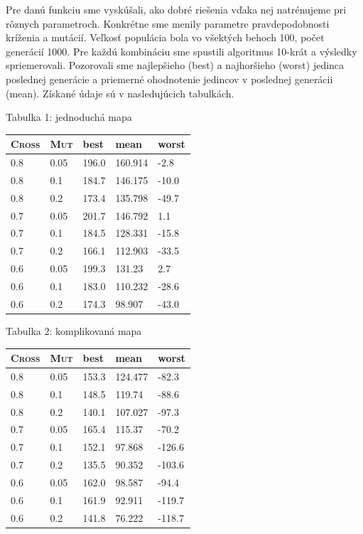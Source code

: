 \documentclass[10pt]{paper}
\begin{document}
Pre danú funkciu sme vyskúšali, ako dobré riešenia vďaka nej natrénujeme pri rôznych parametroch. Konkrétne sme menily parametre pravdepodobnosti kríženia a mutácií. Veľkosť populácia bola vo všektých behoch 100, počet generácií 1000. Pre každú kombináciu sme spustili algoritmus 10-krát a výsledky spriemerovali. Pozorovali sme najlepšieho (best) a najhoršieho (worst) jedinca poslednej generácie a priemerné ohodnotenie jedincov v poslednej generácii (mean). Získané údaje sú v nasledujúcich tabulkách.

\begin{center}
\begin{paracol}{2}
\setlength{\columnseprule}{0pt}
\setlength{\columnsep}{0em}
\begin{leftcolumn}
	Tabulka 1: jednoduchá mapa
	
	
\begin{tabular}{|ll|lll|}
\hline
 \textsc{Cross} & \textsc{Mut}  & best & mean & worst \\ \hline
0.8 & 0.05 & 196.0 & 160.914 & -2.8 \\
0.8 & 0.1 & 184.7 & 146.175 & -10.0 \\
0.8 & 0.2 & 173.4 & 135.798 & -49.7 \\
\hline
0.7 & 0.05 & 201.7 & 146.792 & 1.1 \\
0.7 & 0.1 & 184.5 & 128.331 & -15.8 \\
0.7 & 0.2 & 166.1 & 112.903 & -33.5 \\
\hline
0.6 & 0.05 & 199.3 & 131.23 & 2.7 \\
0.6 & 0.1 & 183.0 & 110.232 & -28.6 \\
0.6 & 0.2 & 174.3 & 98.907 & -43.0 \\
		
\hline
\end{tabular}
\end{leftcolumn}

\begin{rightcolumn}

	Tabulka 2: komplikovaná mapa
\begin{tabular}{|ll|lll|}
\hline
 \textsc{Cross} & \textsc{Mut}  & best & mean & worst \\ \hline

0.8 & 0.05 & 153.3 & 124.477 & -82.3 \\
0.8 & 0.1 & 148.5 & 119.74 & -88.6 \\
0.8 & 0.2 & 140.1 & 107.027 & -97.3\\
\hline
0.7 & 0.05 & 165.4 & 115.37 & -70.2 \\
0.7 & 0.1 & 152.1 & 97.868 & -126.6 \\
0.7 & 0.2 & 135.5 & 90.352 & -103.6 \\
\hline
0.6 & 0.05 & 162.0 & 98.587 & -94.4 \\
0.6 & 0.1 & 161.9 & 92.911 & -119.7 \\
0.6 & 0.2 & 141.8 & 76.222 & -118.7 \\
		
\hline
\end{tabular}	

\end{rightcolumn}
\end{paracol}
\end{center}
\end{document}
